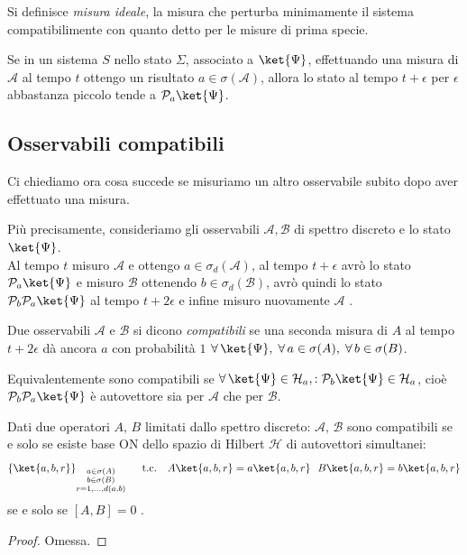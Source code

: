 \begin{definition}
    Si definisce \textit{misura ideale}, la misura che perturba minimamente il sistema compatibilimente con quanto detto per le misure di prima specie.
\end{definition}


\begin{postulato5}
    Se in un sistema \(S\) nello stato \(\Sigma\), associato a \(\ket{\Psi}\), effettuando una misura di \(\mathcal{A}\) al tempo \(t\) ottengo un risultato \(a \in \sigma(\mathcal{A})\),
    allora lo stato al tempo \(t+\epsilon\) per \(\epsilon\) abbastanza piccolo tende a \(\mathcal{P}_a\ket{\Psi}\).
\end{postulato5}


\subsection{Osservabili compatibili}  
Ci chiediamo ora cosa succede se misuriamo un altro osservabile subito dopo aver effettuato una misura.

Più precisamente, consideriamo gli osservabili \(\mathcal{A}, \mathcal{B}\) di spettro discreto e lo stato \(\ket{\Psi}\).\\
Al tempo \(t\) misuro \(\mathcal{A}\) e ottengo \(a \in \sigma_d(\mathcal{A})\), al tempo \(t+\epsilon\) avrò lo stato \(\mathcal{P}_a\ket{\Psi}\) e misuro \(\mathcal{B}\) ottenendo \(b \in \sigma_d(\mathcal{B})\),
avrò quindi lo stato \(\mathcal{P}_b\mathcal{P}_a\ket{\Psi}\) al tempo \(t+2\epsilon\) e infine misuro nuovamente \(\mathcal{A}\) .

\begin{definition}
    Due osservabili \(\mathcal{A}\) e \(\mathcal{B}\) si dicono \textit{compatibili} se una seconda misura di \(A\) al tempo \(t+2\epsilon\)
    dà ancora \(a\) con probabilità \(1\)  \( \forall\, \ket{\Psi},\; \forall\, a \in \sigma(A),\; \forall\, b \in \sigma(B) \).
\end{definition}

\begin{remark}
    Equivalentemente sono compatibili se \( \forall\, \ket{\Psi} \in \mathcal{H}_a,: \mathcal{P}_b \ket{\Psi} \in \mathcal{H}_a \), cioè
    \(\mathcal{P}_b \mathcal{P}_a \ket{\Psi}\) è autovettore sia per \(\mathcal{A}\) che per \(\mathcal{B}\).
\end{remark}

\begin{theorem}
    Dati due operatori \(A, \,B\) limitati dallo spettro discreto: \(\mathcal{A}, \,\mathcal{B}\) sono compatibili se e solo se esiste base ON dello spazio di Hilbert \(\mathcal{H}\) di autovettori simultanei: 
    \[
    \left\{ \ket{a,b,r} \right\}_{\substack{a \in \sigma(A)\\b \in \sigma(B)\\ r = 1,\dots,d(a,b)}} \quad \text{ t.c.} \quad A\ket{a,b,r}= a\ket{a,b,r}\ \ B\ket{a,b,r}=b\ket{a,b,r}
    \]
    se e solo se \(\left[ A, B \right]=0\) .
\end{theorem}
\begin{proof}
    Omessa.
\end{proof}

